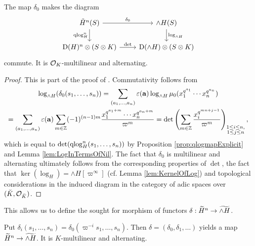 \documentclass[../main.tex]{subfiles}
\begin{document}
\begin{prop}\label{prop:commutativityofdeterminantqlogdiag}
  The map $\delta_0$ makes the diagram 
  \begin{equation*}
    \begin{tikzcd}[ampersand replacement=\&]
    	{\tilde H^n(S)} \& {\wedge H(S)} \\
    	{\Dio(H)^n \otimes (S \otimes K)} \& {\Dio(\wedge H) \otimes(S \otimes K)}
    	\arrow["{\delta_0}", from=1-1, to=1-2]
    	\arrow["{\qlog_H^n}"', from=1-1, to=2-1]
    	\arrow["{\log_{\wedge H}}", from=1-2, to=2-2]
    	\arrow["\det", from=2-1, to=2-2]
    \end{tikzcd}
  \end{equation*}
  commute. It is $\cO_K$-multilinear and alternating.
\begin{proof}
  This is part of the proof of \cite[Theorem
  2.10.3]{BoyarchenkoWeinstein2011MaxVar}.
  Commutativity follows from 
  \begin{multline*}
    \log_{\wedge H}(\delta_0(s_1, \dots, s_n)) = \sum_{(a_1, \dots, a_n)} 
    \varepsilon(\mathbf a) \log_{\wedge H} \mu_0( x_1^{q^{a_1}}\cdots x_n^{q^{a_n}})
     \\ = \sum_{(a_1, \dots, a_n)} \varepsilon(\mathbf a) \sum_{m \in \Z} (-1)^{(n-1)m}
    \frac{x_1^{q^{a_1+m}} \cdots x_n^{q^{a_n+m}}}{\varpi^m} 
    = \det \left( \sum_{m \in \Z} \frac{x_i^{q^{mn + j-1}}}{\varpi^m} \right)_{\substack{
      1 \leq i \leq n,\\
      1 \leq j \leq n}},
  \end{multline*}
  which is equal to $\det(\qlog_H^n(s_1, \dots, s_n))$ by Proposition 
  \ref{prop:qlogmapExplicit} and Lemma \ref{lem:LogInTermsOfNil}. 
  The fact that $\delta_0$ is multilinear and alternating ultimately follows
  from the corresponding properties of $\det$, the fact that $\ker(\log_H) =
  \wedge H[\varpi^\infty]$ (cf. Lemma \ref{lem:KernelOfLog}) and topological
  considerations in the induced diagram in the category of adic spaces over
  $(\breve K, \cO_{\breve K})$.
\end{proof}
\end{prop}

This allows us to define the sought for morphism of functors
$\delta: \Tilde H^n \to \Tilde {\wedge H}$. 
\begin{defi}\label{def:DeltaMap}
  Put $\delta_i(s_1, \dots, s_n) = \delta_0(\varpi^{-i} s_1, \dots, s_n)$. Then 
  $\delta = (\delta_0, \delta_1, \dots)$ yields a map 
  $\Tilde H^n \to \Tilde{\wedge H}$. It is $K$-multilinear and alternating.
\end{defi}
\end{document}
